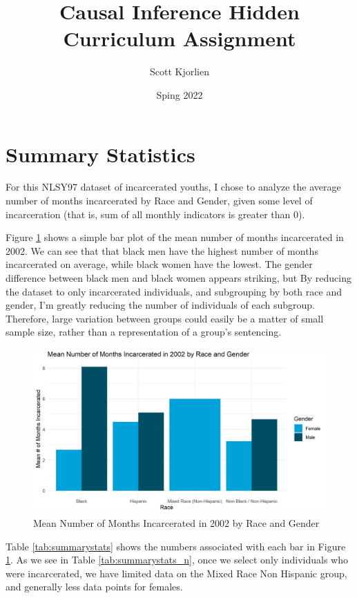 \documentclass{article}
\author{Scott Kjorlien}
\title{Causal Inference Hidden Curriculum Assignment}
\date{Sping 2022}
\begin{document}
\maketitle

\section{Summary Statistics}

For this NLSY97 dataset of incarcerated youths, I chose to analyze the average number of months incarcerated by Race and Gender, given some level of incarceration (that is, sum of all monthly indicators is greater than 0).

Figure \ref{fig:graph} shows a simple bar plot of the mean number of months incarcerated in 2002. We can see that that black men have the highest number of months incarcerated on average, while black women have the lowest. The gender difference between black men and black women appears striking, but 
By reducing the dataset to only incarcerated individuals, and subgrouping by both race and gender, I'm greatly reducing the number of individuals of each subgroup. Therefore, large variation between groups could easily be a matter of small sample size, rather than a representation of a group's sentencing.

\begin{figure}[H]
    \begin{center}
        \includegraphics[width=.85\textwidth]{incarceration_by_racegender.png}
    \end{center}
    \caption{Mean Number of Months Incarcerated in 2002 by Race and Gender}
    \label{fig:graph}
\end{figure}

Table \ref{tab:summarystats} shows the numbers associated with each bar in Figure \ref{fig:graph}. As we see in Table \ref{tab:summarystats_n}, once we select only individuals who were incarcerated, we have limited data on the Mixed Race Non Hispanic group, and generally less data points for females.
\end{document}
